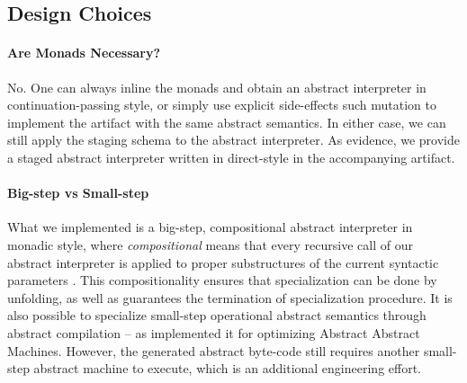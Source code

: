 \subsection{Design Choices}

\paragraph{Are Monads Necessary?} No. One can always inline the monads and
obtain an abstract interpreter in continuation-passing style, or simply use
explicit side-effects such mutation to implement the artifact with the same
abstract semantics. In either case, we can still apply the staging schema to
the abstract interpreter. As evidence, we provide a staged abstract
interpreter written in direct-style in the accompanying artifact.

\paragraph{Big-step vs Small-step}

What we implemented is a big-step, compositional abstract interpreter in monadic
style, where \textit{compositional} means that every recursive call of our abstract
interpreter is applied to proper substructures of the current syntactic
parameters \cite{10.1007/3-540-61580-6_11}. This compositionality ensures that
specialization can be done by unfolding, as well as guarantees the termination
of specialization procedure. It is also possible to specialize small-step
operational abstract semantics through abstract compilation
\cite{Boucher:1996:ACN:647473.727587} -- as
\citet{Johnson:2013:OAA:2500365.2500604} implemented it for
optimizing Abstract Abstract Machines. However, the generated abstract
byte-code still requires another small-step abstract machine to execute, which is
an additional engineering effort.
